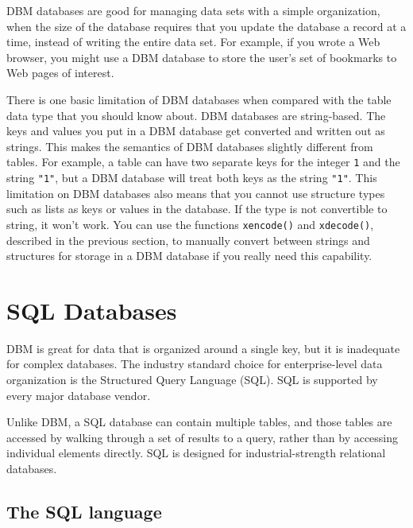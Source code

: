 
DBM databases are good for managing data sets with a simple
organization, when the size of the database requires that you update
the database a record at a time, instead of writing the entire data
set. For example, if you wrote a Web browser, you might use a DBM
database to store the user's set of bookmarks to Web
pages of interest.

There is one basic limitation of DBM databases when compared with the
table data type that you should know about. DBM databases are
string-based. The keys and values you put in a DBM database get
converted and written out as strings. This makes the semantics of DBM
databases slightly different from tables. For example, a table can have
two separate keys for the integer \texttt{1} and the string
\texttt{"1"}, but a DBM database will treat
both keys as the string \texttt{"1"}. This
limitation on DBM databases also means that you cannot use structure
types such as lists as keys or values in the database. If the type is
not convertible to string, it won't work. You can use
the functions \texttt{xencode()} and \texttt{xdecode()}, described in
the previous section, to manually convert between strings and
structures for storage in a DBM database if you really need this
capability.

\section[SQL Databases]{SQL Databases}

DBM is great for data that is organized around a single
key, but it is inadequate for complex databases. The industry
standard choice for enterprise-level data organization is the
Structured Query Language (SQL). SQL is supported by every major
database vendor.

Unlike DBM, a SQL database can contain
multiple tables, and those tables are accessed by walking through a set
of results to a query, rather than by accessing individual elements
directly. SQL is designed for industrial-strength relational databases.

\subsection*{The SQL language}

